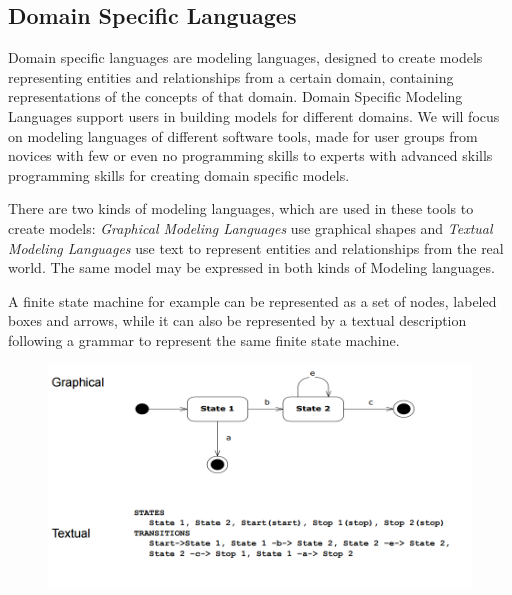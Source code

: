 \documentclass[runningheads,a4paper]{llncs}
\begin{document}
 \subsection{Domain Specific Languages}
 Domain specific languages are modeling languages, designed to create models representing entities and relationships from a certain domain,
 containing representations of the concepts of that domain. 
 Domain Specific Modeling Languages support users in building models for different domains.
 We will focus on modeling languages of different software tools, made for user groups from novices with few or even no programming skills to experts 
 with advanced skills programming skills for creating domain specific models. 
 
 There are two kinds of modeling languages, which are used in these tools to create models:
 \emph{Graphical Modeling Languages} use graphical shapes and
 \emph{Textual Modeling Languages} use text to represent entities and relationships from the real world.
 The same model may be expressed in both kinds of Modeling languages.
 
 A finite state machine for example can be represented as a set of nodes, labeled boxes and arrows, while it can also be 
 represented by a textual description following a grammar to represent the same finite state machine.
 
  \begin{figure}[ht]
      \centering
      \includegraphics[width=\textwidth]{images/GraficalTextualComparison.PNG}
    \end{figure}
 
%  
 
\end{document}
